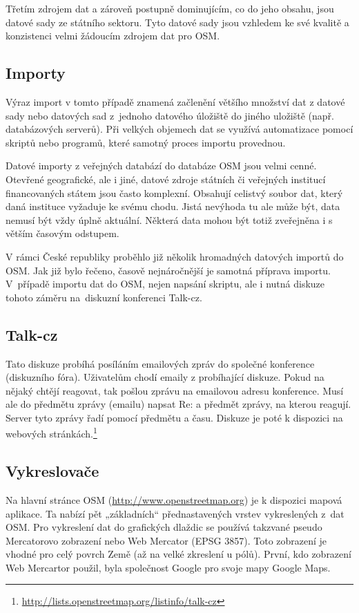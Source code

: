 Třetím zdrojem dat a zároveň postupně dominujícím, co do jeho obsahu, jsou
datové sady ze státního sektoru. Tyto datové sady jsou vzhledem ke své kvalitě a konzistenci velmi žádoucím zdrojem
dat pro OSM.

\subsection{Importy}
\label{Importy}
Výraz import v tomto případě znamená začlenění většího množství dat z datové sady nebo datových sad
z~jednoho datového úložiště do jiného uložiště (např. databázových serverů). Při velkých objemech dat
se využívá automatizace pomocí skriptů nebo programů, které samotný proces importu provednou.

Datové importy z veřejných databází do databáze OSM jsou velmi cenné. 
Otevřené geografické, ale i jiné, datové zdroje státních či veřejných institucí 
financovaných státem jsou často komplexní. Obsahují celistvý
soubor dat, který daná instituce vyžaduje ke svému chodu. Jistá nevýhoda tu 
ale může být, data nemusí být vždy úplně aktuální. Některá data mohou 
být totiž zveřejněna i s větším časovým odstupem.

V rámci České republiky proběhlo již několik hromadných datových importů do OSM. Jak 
již bylo řečeno, časově nejnáročnější je samotná příprava importu.
V~případě importu dat do OSM, nejen napsání skriptu, ale i nutná diskuze tohoto záměru
na~diskuzní konferenci Talk-cz. 

\subsection{Talk-cz}
\label{Talk-cz}
Tato diskuze probíhá posíláním emailových zpráv do společné konference (diskuzního fóra). 
Uživatelům chodí emaily z probíhající diskuze. Pokud na nějaký
chtějí reagovat, tak pošlou zprávu na emailovou adresu konference. Musí ale do předmětu zprávy (emailu) napsat Re: a předmět zprávy, na kterou reagují.
Server tyto zprávy řadí pomocí 
předmětu a času. Diskuze je poté k dispozici na webových stránkách.\footnote{\url{http://lists.openstreetmap.org/listinfo/talk-cz}}

\subsection{Vykreslovače}
\label{Vykreslovače}
Na hlavní stránce OSM (\url{http://www.openstreetmap.org}) je k dispozici mapová aplikace. Ta nabízí pět
„základních“ přednastavených vrstev vykreslených z~dat OSM.
Pro vykreslení dat do grafických dlaždic se používá takzvané pseudo Mercatorovo
zobrazení nebo Web Mercator (EPSG 3857). Toto zobrazení je vhodné pro celý povrch Země (až na velké zkreslení u pólů). 
První, kdo zobrazení Web Mercartor použil, byla společnost Google pro svoje mapy Google Maps.\cite{WebMercator}

